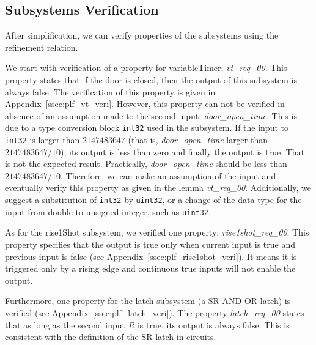 \subsection{Subsystems Verification}
\label{ssec:case_veri}
After simplification, we can verify properties of the subsystems using the refinement relation. 

We start with verification of a property for \textsf{variableTimer}: \emph{vt\_req\_00}. This property states that if the door is closed, then the output of this subsystem is always false. The verification of this property is given in Appendix~\ref{ssec:plf_vt_veri}. However, this property can not be verified in absence of an assumption made to the second input: \emph{door\_open\_time}. This is due to a type conversion block \texttt{int32} used in the subsystem. If the input to \texttt{int32} is larger than $2147483647$ (that is, \emph{door\_open\_time} larger than $2147483647/10$), its output is less than zero and finally the output is true. That is not the expected result. Practically, \emph{door\_open\_time} should be less than $2147483647/10$. Therefore, we can make an assumption of the input and eventually verify this property as given in the lemma \emph{vt\_req\_00}. Additionally, we suggest a substitution of \texttt{int32} by \texttt{uint32}, or a change of the data type for the input from double to unsigned integer, such as \texttt{uint32}. 

As for the \textsf{rise1Shot} subsystem, we verified one property: \emph{rise1shot\_req\_00}. This property specifies that the output is true only when current input is true and previous input is false (see Appendix~\ref{ssec:plf_rise1shot_veri}). It means it is triggered only by a rising edge and continuous true inputs will not enable the output.

Furthermore, one property for the \textsf{latch} subsystem (a SR AND-OR latch) is verified (see Appendix~\ref{ssec:plf_latch_veri}). The property \emph{latch\_req\_00} states that as long as the second input $R$ is true, its output is always false. This is consistent with the definition of the SR latch in circuits.

